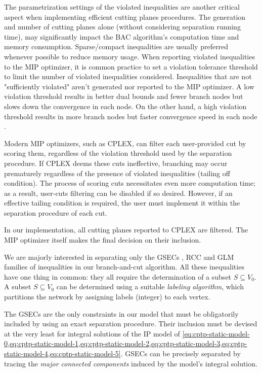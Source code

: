 The parametrization settings of the violated inequalities are another critical aspect
when implementing efficient cutting planes procedures.
The generation and number of cutting planes alone (without considering separation running time),
may significantly impact the BAC algorithm's computation time and memory consumption.
Sparse/compact inequalities are usually preferred whenever possible to reduce memory usage.
When reporting violated inequalities to the MIP optimizer,
it is common practice to set a violation tolerance threshold
to limit the number of violated inequalities considered.
Inequalities that are not "sufficiently violated" aren't generated nor reported to the MIP optimizer.
A low violation threshold results in better dual bounds
and fewer branch nodes but slows down the convergence in each node.
On the other hand, a high violation threshold results in more branch nodes
but faster convergence speed in each node \parencite{jepsen2008branchandcut}.

Modern MIP optimizers, such as CPLEX,
can filter each user-provided cut by scoring them,
regardless of the violation threshold used by the separation procedure.
If CPLEX deems these cuts ineffective,
branching may occur prematurely regardless of the presence of violated inequalities (tailing off condition).
The process of scoring cuts necessitates even more computation time;
as a result, user-cuts filtering can be disabled if so desired.
However, if an effective tailing condition is required,
the user must implement it within the separation procedure of each cut.

In our implementation, all cutting planes reported to CPLEX are filtered.
The MIP optimizer itself makes the final decision on their inclusion.

\medskip

We are majorly interested in separating only the
GSECs ,
RCC 
and GLM 
families of inequalities in our branch-and-cut algorithm.
All these inequalities have one thing in common: they all require
the determination of a subset $S \subseteq V_0$.
A subset $S \subseteq V_0$ can be determined using a suitable \textit{labeling algorithm},
which partitions the network by assigning labels (integer) to each vertex.

The GSECs are the only constraints in our model that must be obligatorily
included by using an exact separation procedure.
Their inclusion must be devised at the very least for integral solutions of the IP model of
\cref{eq:cptp-static-model-0,eq:cptp-static-model-1,eq:cptp-static-model-2,eq:cptp-static-model-3,eq:cptp-static-model-4,eq:cptp-static-model-5}.
GSECs can be precisely separated
by tracing the \textit{major connected components}
induced by the model's integral solution.

